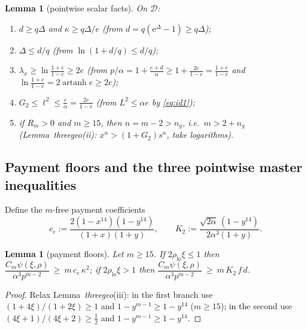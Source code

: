 \documentclass[11pt]{article}
\newtheorem{lemma}[theorem]{Lemma}
\theoremstyle{remark}
\theoremstyle{plain}
\theoremstyle{plain}
\newcommand{\eu}{\mathrm{e}}
\newcommand{\D}{\mathcal D}
\begin{document}
\begin{lemma}[pointwise scalar facts]\label{lem:zc-scalar}
On $\D$:
\begin{enumerate}
\item[(i)] $d\ge q\Delta$ and $\kappa\ge q\Delta/e$
  \quad(from $d=q(\eu^\Delta-1)\ge q\Delta$);
\item[(ii)] $\Delta\le d/q$ \quad(from $\ln(1+d/q)\le d/q$);
\item[(iii)] $\lambda_x\ge\ln\frac{1+e}{1-e}\ge2e$
  \quad(from $p/\alpha=1+\frac{e+d}\alpha\ge1+\frac{2e}{1-e}=\frac{1+e}{1-e}$
  and $\ln\frac{1+e}{1-e}=2\operatorname{artanh}e\ge2e$);
\item[(iv)] $G_2\le\ell^2\le\frac e\alpha=\frac{2e}{1-e}$
  \quad(from $L^2\le\alpha e$ by \eqref{eq:id1});
\item[(v)] if $R_m>0$ and $m\ge15$, then $n=m-2>n_g$, i.e.\ $m>2+n_g$
  \quad(Lemma~\emph{threegeo}(ii): $x^n>(1+G_2)s^n$, take logarithms).
\end{enumerate}
\end{lemma}

\subsection{Payment floors and the three pointwise master inequalities}
\label{sec:zoneC-master}

Define the $m$-free payment coefficients
\[
 c_e:=\frac{2(1-x^{14})(1-y^{14})}{(1+x)(1+y)},
 \qquad
 K_2:=\frac{\sqrt{2\alpha}\,(1-y^{14})}{2\alpha^3(1+y)} .
\]

\begin{lemma}[payment floors]\label{lem:zc-payfloor}
Let $m\ge15$.  If $2\rho_{\mathrm{lo}}\xi\le1$ then
$\dfrac{C_m\psi(\xi,\rho)}{\alpha^3p^{m-2}}\ \ge\ m\,c_e\,\kappa^2$;
if $2\rho_{\mathrm{lo}}\xi>1$ then
$\dfrac{C_m\psi(\xi,\rho)}{\alpha^3p^{m-2}}\ \ge\ m\,K_2\,f\,d$.
\end{lemma}

\begin{proof}
Relax Lemma~\emph{threegeo}(iii): in the first branch use
$(1+4\xi)/(1+2\xi)\ge1$ and $1-y^{m-1}\ge1-y^{14}$ ($m\ge15$); in the second
use $(4\xi+1)/(4\xi+2)\ge\tfrac12$ and $1-y^{m-1}\ge1-y^{14}$.
\end{proof}
\end{document}
